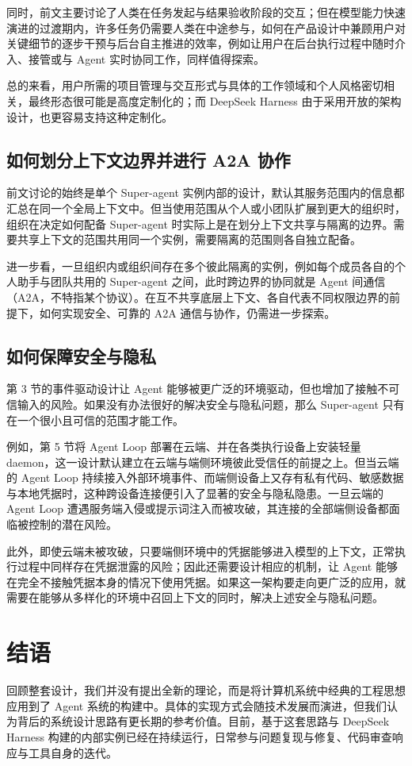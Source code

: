 \documentclass[11pt,a4paper,UTF8,fontset=windows]{ctexart}
\begin{document}
同时，前文主要讨论了人类在任务发起与结果验收阶段的交互；但在模型能力快速演进的过渡期内，许多任务仍需要人类在中途参与，如何在产品设计中兼顾用户对关键细节的逐步干预与后台自主推进的效率，例如让用户在后台执行过程中随时介入、接管或与 Agent 实时协同工作，同样值得探索。

总的来看，用户所需的项目管理与交互形式与具体的工作领域和个人风格密切相关，最终形态很可能是高度定制化的；而 DeepSeek Harness 由于采用开放的架构设计，也更容易支持这种定制化。

\subsection{如何划分上下文边界并进行 A2A 协作}

前文讨论的始终是单个 Super-agent 实例内部的设计，默认其服务范围内的信息都汇总在同一个全局上下文中。但当使用范围从个人或小团队扩展到更大的组织时，组织在决定如何配备 Super-agent 时实际上是在划分上下文共享与隔离的边界。需要共享上下文的范围共用同一个实例，需要隔离的范围则各自独立配备。

进一步看，一旦组织内或组织间存在多个彼此隔离的实例，例如每个成员各自的个人助手与团队共用的 Super-agent 之间，此时跨边界的协同就是 Agent 间通信（A2A，不特指某个协议）。在互不共享底层上下文、各自代表不同权限边界的前提下，如何实现安全、可靠的 A2A 通信与协作，仍需进一步探索。

\subsection{如何保障安全与隐私}

第 3 节的事件驱动设计让 Agent 能够被更广泛的环境驱动，但也增加了接触不可信输入的风险。如果没有办法很好的解决安全与隐私问题，那么 Super-agent 只有在一个很小且可信的范围才能工作。

例如，第 5 节将 Agent Loop 部署在云端、并在各类执行设备上安装轻量 daemon，这一设计默认建立在云端与端侧环境彼此受信任的前提之上。但当云端的 Agent Loop 持续接入外部环境事件、而端侧设备上又存有私有代码、敏感数据与本地凭据时，这种跨设备连接便引入了显著的安全与隐私隐患。一旦云端的 Agent Loop 遭遇服务端入侵或提示词注入而被攻破，其连接的全部端侧设备都面临被控制的潜在风险。

此外，即使云端未被攻破，只要端侧环境中的凭据能够进入模型的上下文，正常执行过程中同样存在凭据泄露的风险；因此还需要设计相应的机制，让 Agent 能够在完全不接触凭据本身的情况下使用凭据。如果这一架构要走向更广泛的应用，就需要在能够从多样化的环境中召回上下文的同时，解决上述安全与隐私问题。

\section{结语}
回顾整套设计，我们并没有提出全新的理论，而是将计算机系统中经典的工程思想应用到了 Agent 系统的构建中。具体的实现方式会随技术发展而演进，但我们认为背后的系统设计思路有更长期的参考价值。目前，基于这套思路与 DeepSeek Harness 构建的内部实例已经在持续运行，日常参与问题复现与修复、代码审查响应与工具自身的迭代。
\end{document}
